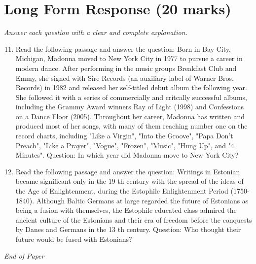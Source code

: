 \documentclass[12pt]{article}
\begin{document}
\section*{Long Form Response (20 marks)}
\textit{Answer each question with a clear and complete explanation.}
\begin{enumerate}[label=\arabic*.]
\setcounter{enumi}{10}
\item Read the following passage and answer the question: Born in Bay City, Michigan, Madonna moved to New York City in 1977 to pursue a career in modern dance. After performing in the music groups Breakfast Club and Emmy, she signed with Sire Records (an auxiliary label of Warner Bros. Records) in 1982 and released her self-titled debut album the following year. She followed it with a series of commercially and critcally successful albums, including the Grammy Award winners Ray of Light (1998) and Confessions on a Dance Floor (2005). Throughout her career, Madonna has written and produced most of her songs, with many of them reaching number one on the record charts, including "Like a Virgin", "Into the Groove", "Papa Don't Preach", "Like a Prayer", "Vogue", "Frozen", "Music", "Hung Up", and "4 Minutes". Question: In which year did Madonna move to New York City?
\item Read the following passage and answer the question: Writings in Estonian became significant only in the 19 th century with the spread of the ideas of the Age of Enlightenment, during the Estophile Enlightenment Period (1750-1840). Although Baltic Germans at large regarded the future of Estonians as being a fusion with themselves, the Estophile educated class admired the ancient culture of the Estonians and their era of freedom before the conquests by Danes and Germans in the 13 th century. Question: Who thought their future would be fused with Estonians?
\end{enumerate}

\vfill
\noindent\textit{End of Paper}
\end{document}
